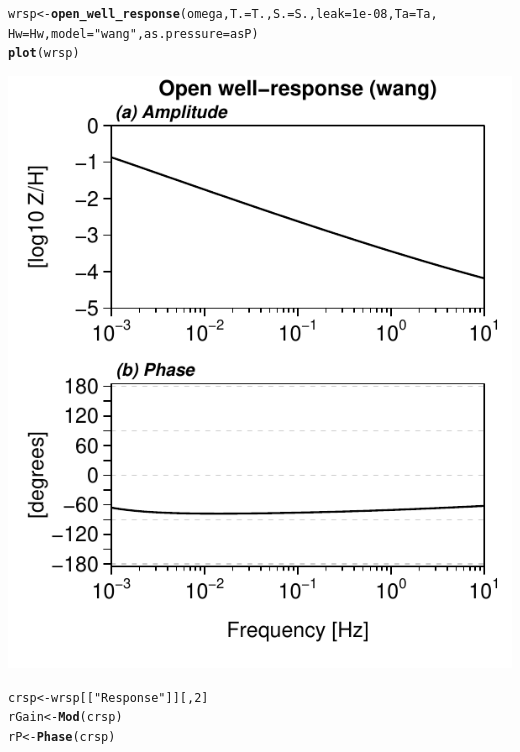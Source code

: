 \documentclass[12pt]{article}\usepackage[]{graphicx}\usepackage[]{color}
\makeatletter
\def\maxwidth{ %
  \ifdim\Gin@nat@width>\linewidth
    \linewidth
  \else
    \Gin@nat@width
  \fi
}
\newcommand{\hlnum}[1]{\textcolor[rgb]{0.686,0.059,0.569}{#1}}%
\newcommand{\hlstr}[1]{\textcolor[rgb]{0.192,0.494,0.8}{#1}}%
\newcommand{\hlstd}[1]{\textcolor[rgb]{0.345,0.345,0.345}{#1}}%
\newcommand{\hlkwb}[1]{\textcolor[rgb]{0.69,0.353,0.396}{#1}}%
\newcommand{\hlkwc}[1]{\textcolor[rgb]{0.333,0.667,0.333}{#1}}%
\newcommand{\hlkwd}[1]{\textcolor[rgb]{0.737,0.353,0.396}{\textbf{#1}}}%
\newenvironment{kframe}{%
 \def\at@end@of@kframe{}%
 \ifinner\ifhmode%
  \def\at@end@of@kframe{\end{minipage}}%
  \begin{minipage}{\columnwidth}%
 \fi\fi%
 \def\FrameCommand##1{\hskip\@totalleftmargin \hskip-\fboxsep
 \colorbox{shadecolor}{##1}\hskip-\fboxsep
     \hskip-\linewidth \hskip-\@totalleftmargin \hskip\columnwidth}%
 \MakeFramed {\advance\hsize-\width
   \@totalleftmargin\z@ \linewidth\hsize
   \@setminipage}}%
 {\par\unskip\endMakeFramed%
 \at@end@of@kframe}
\newenvironment{knitrout}{}{} %
\makeatother
\begin{document}
\begin{knitrout}\small
{}\color{fgcolor}\begin{kframe}
\begin{alltt}
\hlstd{wrsp} \hlkwb{<-} \hlkwd{open_well_response}\hlstd{(omega,} \hlkwc{T.} \hlstd{= T.,} \hlkwc{S.} \hlstd{= S.,} \hlkwc{leak} \hlstd{=} \hlnum{1e-08}\hlstd{,} \hlkwc{Ta} \hlstd{= Ta,}
    \hlkwc{Hw} \hlstd{= Hw,} \hlkwc{model} \hlstd{=} \hlstr{"wang"}\hlstd{,} \hlkwc{as.pressure} \hlstd{= asP)}
\hlkwd{plot}\hlstd{(wrsp)}
\end{alltt}
\end{kframe}
\includegraphics[width=\maxwidth]{figure/WANGRESP-1} 
\begin{kframe}\begin{alltt}
\hlstd{crsp} \hlkwb{<-} \hlstd{wrsp[[}\hlstr{"Response"}\hlstd{]][,} \hlnum{2}\hlstd{]}
\hlstd{rGain} \hlkwb{<-} \hlkwd{Mod}\hlstd{(crsp)}
\hlstd{rP} \hlkwb{<-} \hlkwd{Phase}\hlstd{(crsp)}
\end{alltt}
\end{kframe}
\end{knitrout}
\end{document}
